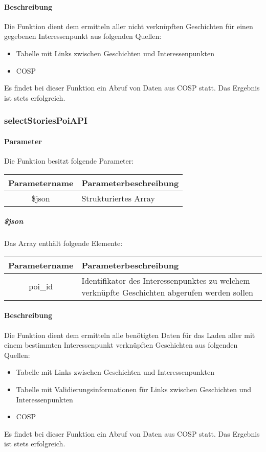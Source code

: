\paragraph{Beschreibung} Die Funktion dient dem ermitteln aller nicht verknüpften Geschichten für einen gegebenen Interessenpunkt aus folgenden Quellen:
\begin{itemize}
	\item Tabelle mit Links zwischen Geschichten und Interessenpunkten
	\item COSP
\end{itemize}
Es findet bei dieser Funktion ein Abruf von Daten aus {\glqq COSP\grqq} statt. Das Ergebnis ist stets erfolgreich.
\subsubsection{selectStoriesPoiAPI}
\paragraph{Parameter} Die Funktion besitzt folgende Parameter:
\begin{table}[H]
	\begin{tabular}{|c|p{11cm}|}
		\hline
		\textbf{Parametername} & \textbf{Parameterbeschreibung} \\ \hline
		\$json & Strukturiertes Array \\ \hline
	\end{tabular}
\end{table}
\subparagraph{\$json}Das Array enthält folgende Elemente:
\begin{table}[H]
	\begin{tabular}{|c|p{11cm}|}
		\hline
		\textbf{Parametername} & \textbf{Parameterbeschreibung} \\ \hline
		poi\_id & Identifikator des Interessenpunktes zu welchem verknüpfte Geschichten abgerufen werden sollen \\ \hline
	\end{tabular}
\end{table}
\paragraph{Beschreibung} Die Funktion dient dem ermitteln alle benötigten Daten für das Laden aller mit einem bestimmten Interessenpunkt verknüpften Geschichten aus folgenden Quellen:
\begin{itemize}
	\item Tabelle mit Links zwischen Geschichten und Interessenpunkten
	\item Tabelle mit Validierungsinformationen für Links zwischen Geschichten und Interessenpunkten
	\item COSP
\end{itemize}
Es findet bei dieser Funktion ein Abruf von Daten aus {\glqq COSP\grqq} statt. Das Ergebnis ist stets erfolgreich.
